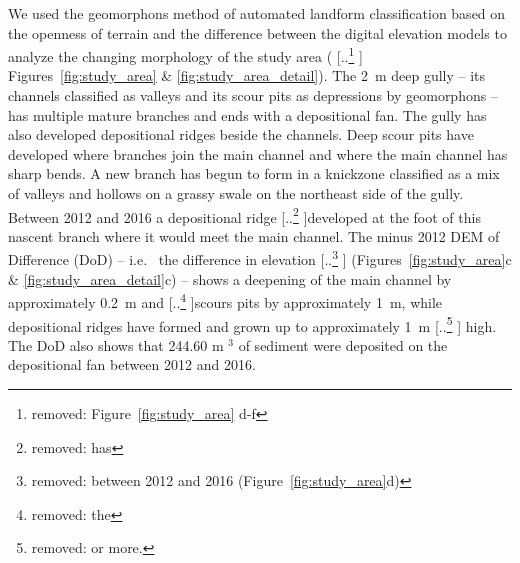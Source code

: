 \documentclass[gmd, manuscript]{copernicus}
\providecommand{\DIFadd}[1]{{\protect\color{blue} \sf #1}} %
\providecommand{\DIFdel}[1]{{\protect\color{red} [..\footnote{removed: #1} ]}} %
\providecommand{\DIFaddbegin}{} %
\providecommand{\DIFaddend}{} %
\providecommand{\DIFdelbegin}{} %
\providecommand{\DIFdelend}{} %
\begin{document}
We used the geomorphons method 
of automated landform classification
based on the openness of terrain \citep{Jasiewicz2013}
and the difference between the digital elevation models 
to analyze the changing morphology of the study area
(\DIFdelbegin \DIFdel{Figure~\ref{fig:study_area} d-f}\DIFdelend \DIFaddbegin \DIFadd{Figures~\ref{fig:study_area} \& \ref{fig:study_area_detail}}\DIFaddend ). 
%
The 2~\unit{m} deep gully -- 
its channels classified as valleys and 
its scour pits as depressions by geomorphons -- 
has multiple mature branches
and ends with a depositional fan.
%
The gully has also developed 
depositional ridges beside the channels.
Deep scour pits have developed 
where branches join the main channel 
and where the main channel has sharp bends.
%
A new branch has begun to form 
in a knickzone classified as a mix of valleys and hollows
on a grassy swale on the northeast side of the gully.
Between 2012 and 2016 a depositional ridge
\DIFdelbegin \DIFdel{has }\DIFdelend developed at the foot of this nascent branch
where it would meet the main channel. 
%
The \DIFaddbegin \DIFadd{2016 minus 2012 DEM of Difference (DoD) -- 
i.e.~ the }\DIFaddend difference in elevation 
\DIFdelbegin \DIFdel{between 2012 and 2016
(Figure~\ref{fig:study_area}d) }\DIFdelend \DIFaddbegin \DIFadd{(Figures~\ref{fig:study_area}c \& \ref{fig:study_area_detail}c) --
}\DIFaddend shows a deepening of the main channel 
by approximately 0.2~\unit{m} 
and \DIFdelbegin \DIFdel{the }\DIFdelend scours pits by approximately 1~\unit{m},
while depositional ridges have formed and grown up to
approximately 1~\unit{m} \DIFdelbegin \DIFdel{or more.
}\DIFdelend \DIFaddbegin \DIFadd{high.
The DoD also shows that
244.60 }\unit{m}\DIFadd{$^3$ of sediment were deposited
on the depositional fan between 2012 and 2016.
}\DIFaddend 
\end{document}
